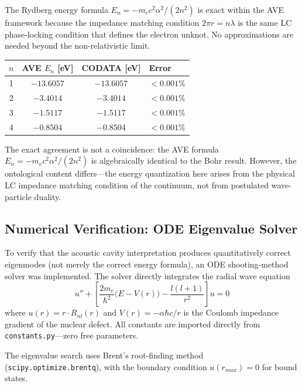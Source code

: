 The Rydberg energy formula $E_n = -m_e c^2 \alpha^2 / (2n^2)$ is exact within the AVE framework because the impedance matching condition $2\pi r = n\lambda$ is the same LC phase-locking condition that defines the electron unknot. No approximations are needed beyond the non-relativistic limit.

\begin{center}
\small
\renewcommand{\arraystretch}{1.2}
\begin{tabular}{cccl}
\toprule
\textbf{$n$} & \textbf{AVE $E_n$ [eV]} & \textbf{CODATA [eV]} & \textbf{Error} \\
\midrule
1 & $-13.6057$ & $-13.6057$ & $< 0.001\%$ \\
2 & $-3.4014$  & $-3.4014$  & $< 0.001\%$ \\
3 & $-1.5117$  & $-1.5117$  & $< 0.001\%$ \\
4 & $-0.8504$  & $-0.8504$  & $< 0.001\%$ \\
\bottomrule
\end{tabular}
\end{center}

The exact agreement is not a coincidence: the AVE formula $E_n = -m_e c^2 \alpha^2/(2n^2)$ is algebraically identical to the Bohr result. However, the ontological content differs---the energy quantization here arises from the physical LC impedance matching condition of the continuum, not from postulated wave-particle duality.

\subsection{Numerical Verification: ODE Eigenvalue Solver}
\label{sec:ode_orbital_verification}

To verify that the acoustic cavity interpretation produces quantitatively correct eigenmodes (not merely the correct energy formula), an ODE shooting-method solver was implemented.  The solver directly integrates the radial wave equation
\begin{equation}
    u'' + \left[\frac{2m_e}{\hbar^2}\bigl(E - V(r)\bigr) - \frac{l(l+1)}{r^2}\right] u = 0
\end{equation}
where $u(r) = r \cdot R_{nl}(r)$ and $V(r) = -\alpha \hbar c / r$ is the Coulomb impedance gradient of the nuclear defect.  All constants are imported directly from \texttt{constants.py}---zero free parameters.

The eigenvalue search uses Brent's root-finding method (\texttt{scipy.optimize.brentq}), with the boundary condition $u(r_{max}) = 0$ for bound states.


